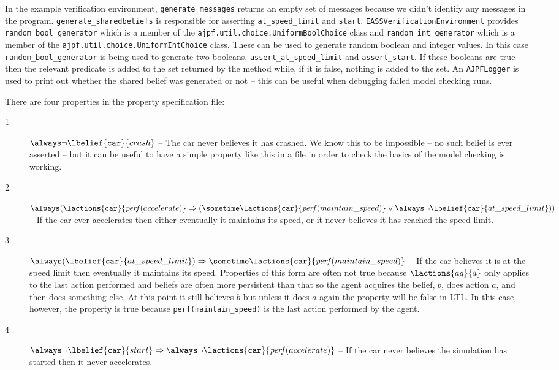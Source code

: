 \documentclass[a4]{article}
\begin{document}
In the example verification environment, \texttt{generate\_messages} returns an empty set of messages because we didn't identify any messages in the program.  \texttt{generate\_sharedbeliefs} is responsible for asserting \lstinline{at_speed_limit} and \lstinline{start}.  \texttt{EASSVerificationEnvironment} provides \texttt{random\_bool\_generator} which is a member of the \texttt{ajpf.util.choice.UniformBoolChoice} class and \texttt{random\_int\_generator} which is a member of the \texttt{ajpf.util.choice.UniformIntChoice} class.  These can be used to generate random boolean and integer values.  In this case \texttt{random\_bool\_generator} is being used to generate two booleans, \texttt{assert\_at\_speed\_limit} and \texttt{assert\_start}.  If these booleans are true then the relevant predicate is added to the set returned by the method while, if it is false, nothing is added to the set.  An \texttt{AJPFLogger} is used to print out whether the shared belief was generated or not -- this can be useful when debugging failed model checking runs.

There are four properties in the property specification file:
\begin{description}
\item[1] $\always \neg \lbelief{\texttt{car}}{crash}$ -- The car never believes it has crashed.  We know this to be impossible -- no such belief is ever asserted -- but it can be useful to have a simple property like this in a file in order to check the basics of the model checking is working.
\item[2] $\always ( \lactions{\texttt{car}}{\mathit{perf}(accelerate)} \Rightarrow (\sometime \lactions{\texttt{car}}{\mathit{perf}(maintain\_speed)} \lor \always  \neg \lbelief{\texttt{car}}{at\_speed\_limit}))$ -- If the car ever accelerates then either eventually it maintains its speed, or it never believes it has reached the speed limit.
\item[3] $\always ( \lbelief{\texttt{car}}{at\_speed\_limit}) \Rightarrow \sometime \lactions{\texttt{car}}{\mathit{perf}(maintain\_speed)}$ -- If the car believes it is at the speed limit then eventually it maintains its speed.  Properties of this form are often not true because $\lactions{ag}{a}$ only applies to the last action performed and beliefs are often more persistent than that so the agent acquires the belief, $b$, does action $a$, and then does something else.  At this point it still believes $b$ but unless it does $a$ again the property will be false in LTL.  In this case, however, the property is true because \lstinline{perf(maintain_speed)} is the last action performed by the agent.
\item[4] $\always \neg \lbelief{\texttt{car}}{start} \Rightarrow \always \neg \lactions{\texttt{car}}{\mathit{perf}(accelerate)}$ -- If the car never believes the simulation has started then it never accelerates.
\end{description}  
\end{document}
